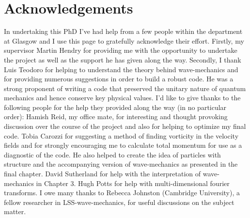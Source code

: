 \thispagestyle{empty}
\section*{Acknowledgements}
In undertaking this PhD I've had help from a few people within the department at Glasgow and I use this page to gratefully acknowledge their effort. Firstly, my supervisor Martin Hendry for providing me with the opportunity to undertake the project as well as the support he has given along the way. Secondly, I thank Luis Teodoro for helping to understand the theory behind wave-mechanics and for providing numerous suggestions in order to build a robust code. He was a strong proponent of writing a code that preserved the unitary nature of quantum mechanics and hence conserve key physical values.
\newline
\newline
I'd like to give thanks to the following people for the help they provided along the way (in no particular order):
\newline
\newline
Hamish Reid, my office mate, for interesting and thought provoking discussion over the course of the project and also for helping to optimize my final code.
\newline
\newline
Tobia Carozzi for suggesting a method of finding vorticity in the velocity fields and for strongly encouraging me to calculate total momentum for use as a diagnostic of the code. He also helped to create the idea of particles with structure and the accompanying version of wave-mechanics as presented in the final chapter.
\newline
\newline
David Sutherland for help with the interpretation of wave-mechanics in Chapter 3.
\newline
\newline
Hugh Potts for help with multi-dimensional fourier transforms.
\newline
\newline
I owe many thanks to Rebecca Johnston (Cambridge University), a fellow researcher in LSS-wave-mechanics, for useful discussions on the subject matter.
